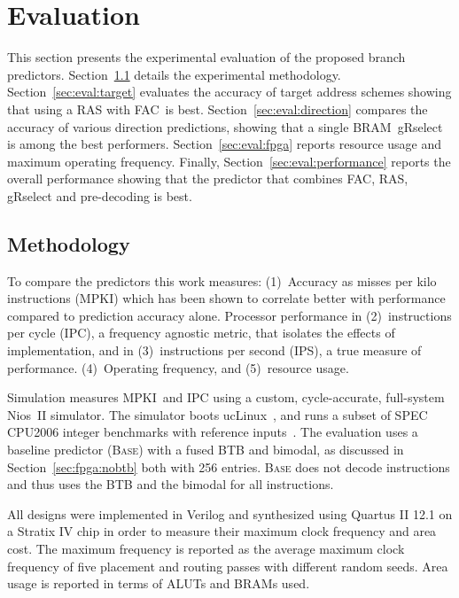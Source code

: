 \chapter{Evaluation}
\label{chap:eval}

This section presents the experimental evaluation of the proposed branch predictors.
Section~\ref{sec:eval:methodology} details the experimental methodology. Section~\ref{sec:eval:target} evaluates the accuracy of  target address schemes showing that using a RAS with FAC\  is best. Section~\ref{sec:eval:direction} compares the accuracy of various direction predictions, showing that a single BRAM\ gRselect is among the best performers. Section~\ref{sec:eval:fpga} reports  resource usage and maximum operating frequency. Finally,  Section~\ref{sec:eval:performance} reports the overall performance showing that the predictor that combines FAC, RAS, gRselect and pre-decoding is best. 


\section{Methodology}
\label{sec:eval:methodology}

To compare the predictors this work measures: (1)~Accuracy as misses per kilo instructions (MPKI) which has been shown to correlate better with performance compared to  prediction accuracy alone. Processor performance in (2)~instructions per cycle (IPC), a frequency agnostic metric, that isolates the effects of implementation, and  in (3)~instructions per second (IPS), a true measure of performance. (4)~Operating frequency, and (5)~resource usage.

Simulation measures MPKI\ and IPC using a custom, cycle-accurate, full-system Nios~II simulator. The simulator boots ucLinux~\cite{uclinux}, and runs a subset of SPEC CPU2006 integer benchmarks with reference inputs~\cite{spec2k6}.
The evaluation uses a baseline predictor (\textsc{Base}) with a fused BTB and bimodal, as discussed in Section~\ref{sec:fpga:nobtb} both with 256 entries. \textsc{Base} does not decode instructions and thus uses the BTB and the bimodal for all instructions. 

All designs were implemented in Verilog and synthesized using Quartus II 12.1 on a Stratix IV chip in order to measure their maximum clock frequency and area cost. The maximum frequency is reported as the average maximum clock frequency of five placement and routing passes with different random seeds. Area usage is reported in terms of ALUTs and BRAMs used.


